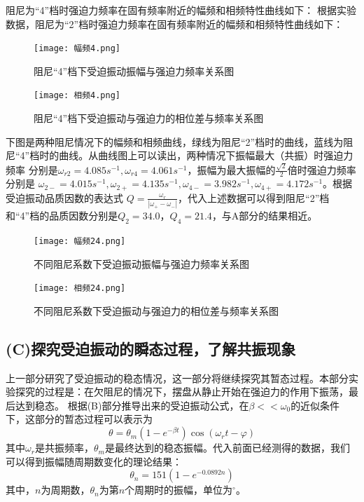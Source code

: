 \documentclass[11pt,a4paper,UTF8]{ctexart}
\begin{document}
阻尼为“4”档时强迫力频率在固有频率附近的幅频和相频特性曲线如下：
根据实验数据，阻尼为“2”档时强迫力频率在固有频率附近的幅频和相频特性曲线如下：
\begin{figure}[h]
	\centering
	\begin{minipage}[t]{0.48\textwidth}
	\centering
	\texttt{[image: 幅频4.png]}
	\caption{阻尼“4”档下受迫振动振幅与强迫力频率关系图}
	\end{minipage}
	\begin{minipage}[t]{0.48\textwidth}
	\centering
	\texttt{[image: 相频4.png]}
	\caption{阻尼“4”档下受迫振动与强迫力的相位差与频率关系图}
	\end{minipage}
\end{figure}

下图是两种阻尼情况下的幅频和相频曲线，绿线为阻尼“2”档时的曲线，蓝线为阻尼“4”档时的曲线。从曲线图上可以读出，两种情况下振幅最大（共振）时强迫力频率
分别是$\omega_{r2}=4.085s^{-1},\omega_{r4}=4.061s^{-1}$，振幅为最大振幅的$\frac{\sqrt{2}}{2}$倍时强迫力频率分别是
$\omega_{2-}=4.015s^{-1},\omega_{2+}=4.135s^{-1},\omega_{4-}=3.982s^{-1},\omega_{4+}=4.172s^{-1}$。根据受迫振动品质因数的表达式
$Q=\frac{\omega_r}{|\omega_{+} -\omega_{-}|}$，代入上述数据可以得到阻尼“2”档和“4”档的品质因数分别是$\boxed{Q_2=34.0}$，$\boxed{Q_4=21.4}$，与A部分的结果相近。

\begin{figure}[H]
	\centering
	\texttt{[image: 幅频24.png]}
	\caption{不同阻尼系数下受迫振动振幅与强迫力频率关系图}
\end{figure}

\begin{figure}[H]
	\centering
	\texttt{[image: 相频24.png]}
	\caption{不同阻尼系数下受迫振动与强迫力的相位差与频率关系图}
\end{figure}

\subsection{(C)探究受迫振动的瞬态过程，了解共振现象}

上一部分研究了受迫振动的稳态情况，这一部分将继续探究其暂态过程。本部分实验探究的过程是：在欠阻尼的情况下，摆盘从静止开始在强迫力的作用下振荡，最后达到稳态。
根据(B)部分推导出来的受迫振动公式，在$\beta<<\omega_0$的近似条件下，这部分的暂态过程可以表示为
	\[\theta=\theta_m(1-e^{-\beta t})\cos(\omega_rt-\varphi)\tag{16}\]
其中$\omega_r$是共振频率，$\theta_m$是最终达到的稳态振幅。代入前面已经测得的数据，我们可以得到振幅随周期数变化的理论结果：
	\[\theta_n=151(1-e^{-0.0892n})\tag{17}\]
其中，$n$为周期数，$\theta_n$为第$n$个周期时的振幅，单位为$^{\circ}$。
\end{document}
